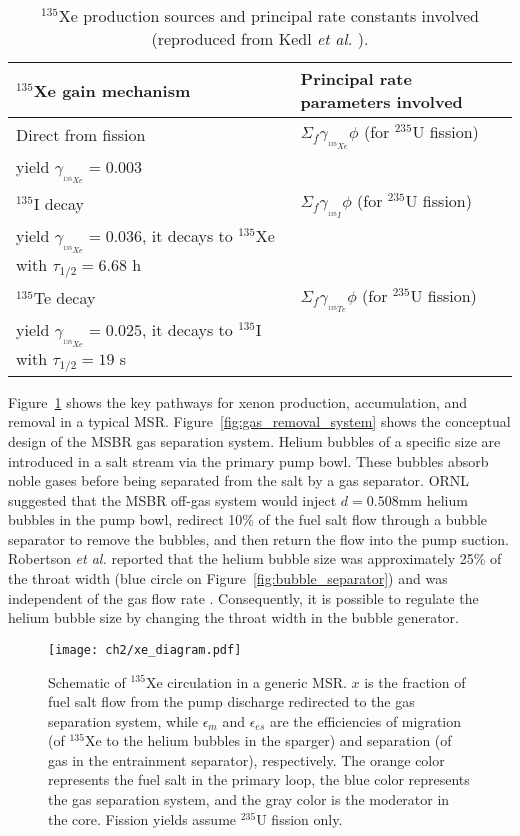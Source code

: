 \begin{table}[ht!]
	\caption{$^{135}$Xe production sources and principal rate constants 
		involved (reproduced from Kedl \emph{et al.} 
		\cite{kedl_development_1967}).}
	\centering
	\begin{tabularx}{\textwidth}{b  b}
		\hline \textbf{$^{135}$Xe gain mechanism} & \textbf{Principal rate 
			parameters involved}  	\\ [5pt] \hline 
		Direct from fission & $\Sigma_f \gamma_{_{^{135}Xe}}\phi$ (for 
		$^{235}$U fission) \\
		yield $\gamma_{_{^{135}Xe}}\!\!\!=0.003$ & \\ [5pt] \hline 
		$^{135}$I decay     & $\Sigma_f \gamma_{_{^{135}I}}\phi$ (for 
		$^{235}$U fission) \\
		yield $\gamma_{_{^{135}Xe}}\!\!\!=0.036$, it decays to $^{135}$Xe with 
		$\tau_{1/2}=6.68$ h & 			                    \\	[5pt]	\hline 
		$^{135}$Te decay    & $\Sigma_f \gamma_{_{^{135}Te}}\phi$ (for 
		$^{235}$U 		fission) \\
		yield $\gamma_{_{^{135}Xe}}\!\!\!=0.025$, 
		it decays to $^{135}$I with $\tau_{1/2}=19$ s 
		& 			                    \\ [5pt]	\hline
	\end{tabularx}
	\label{tab:xe_gain}
\end{table}
Figure~\ref{fig:xe_diagram} shows the key pathways for xenon production, 
accumulation, and removal in a typical \gls{MSR}.  
Figure~\ref{fig:gas_removal_system} shows the conceptual design of the  
\gls{MSBR} gas separation system. Helium bubbles of a specific size are 
introduced in a salt stream via the primary pump bowl. These bubbles absorb 
noble gases before being separated from the salt by a gas separator. 
\gls{ORNL} suggested that the \gls{MSBR} off-gas system would inject 
$d=0.508$mm helium bubbles in the pump bowl, redirect 10\% of the fuel salt 
flow through a bubble separator to remove the bubbles, and then return the 
flow into the pump suction. Robertson \emph{et al.} reported that the helium 
bubble size was approximately 25\% of the throat width (blue circle on 
Figure~\ref{fig:bubble_separator}) and was independent of the gas flow rate 
\cite{robertson_conceptual_1971}. Consequently, it is possible to regulate the 
helium bubble size by changing the throat width in the bubble generator.
\begin{figure}[htp!] %
	\centering
	\texttt{[image: ch2/xe\_diagram.pdf]}
	\caption{Schematic of $^{135}$Xe circulation in a generic \gls{MSR}. $x$ 
	is the fraction of fuel salt flow from the pump discharge redirected to 
	the gas separation system, while $\epsilon_m$ and $\epsilon_{es}$ are the 
	efficiencies of migration (of $^{135}$Xe to the helium bubbles in the 
	sparger) and separation (of gas in the entrainment separator), 
	respectively. The orange color represents the fuel salt in the primary 
	loop, the blue color represents the gas separation system, and the gray 
	color is the moderator in the core. Fission yields assume $^{235}$U 
	fission 	only.}
	\label{fig:xe_diagram}
\end{figure}
